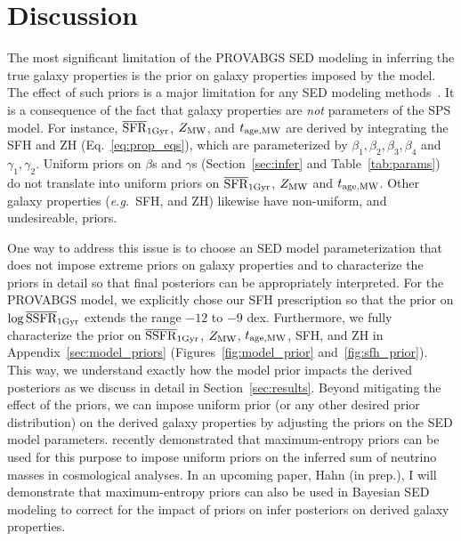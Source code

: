 \section{Discussion} \label{sec:discuss}
The most significant limitation of the {\sc PROVABGS} SED modeling in
inferring the true galaxy properties is the prior on galaxy properties imposed
by the model. 
The effect of such priors is  a major limitation for any SED modeling
methods~\citep[\emph{e.g.}][]{carnall2017, leja2019}. 
It is a consequence of the fact that galaxy properties are \emph{not}
parameters of the SPS model.
For instance, $\overline{\rm SFR}_{\rm 1Gyr}$, $Z_{\rm MW}$, and $t_{\rm age, MW}$ are derived by integrating the SFH
and ZH (Eq.~\ref{eq:prop_eqs}), which are parameterized by $\beta_1, \beta_2,
\beta_3, \beta_4$ and $\gamma_1, \gamma_2$. 
Uniform priors on $\beta$s and $\gamma$s (Section~\ref{sec:infer} and
Table~\ref{tab:params}) do not translate into uniform priors on $\overline{\rm SFR}_{\rm 1Gyr}$,
$Z_{\rm MW}$ and $t_{\rm age, MW}$.
Other galaxy properties (\emph{e.g.}~SFH, and ZH) likewise have
non-uniform, and undesireable, priors. 

One way to address this issue is to choose an SED model parameterization that
does not impose extreme priors on galaxy properties and to characterize the
priors in detail so that final posteriors can be appropriately interpreted. 
For the {\sc PROVABGS} model, we explicitly chose our SFH prescription so that
the prior on $\log\overline{\rm SSFR}_{\rm 1Gyr}$ extends the range $-12$ to $-9$ dex.
Furthermore, we fully characterize the prior on $\overline{\rm SSFR}_{\rm 1Gyr}$, $Z_{\rm MW}$, $t_{\rm age, MW}$,
SFH, and ZH in Appendix~\ref{sec:model_priors} (Figures~\ref{fig:model_prior}
and~\ref{fig:sfh_prior}). 
This way, we understand exactly how the model prior impacts the derived
posteriors as we discuss in detail in Section~\ref{sec:results}. 
Beyond mitigating the effect of the priors, we can impose uniform prior (or any
other desired prior distribution) on the derived galaxy properties by adjusting
the priors on the SED model parameters. 
\cite{handley2019} recently demonstrated that maximum-entropy priors can be
used for this purpose to impose uniform priors on the inferred sum of neutrino
masses in cosmological analyses. 
In an upcoming paper, Hahn (in prep.), I will demonstrate that maximum-entropy
priors can also be used in Bayesian SED modeling to correct for the impact of
priors on infer posteriors on derived galaxy properties. 


